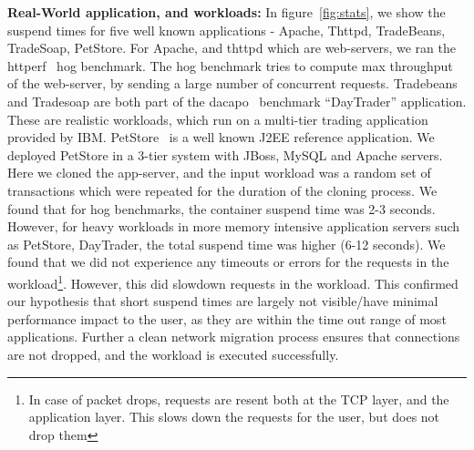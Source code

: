 \noindent
\textbf{Real-World application, and workloads:}
In figure~\ref{fig:stats}, we show the suspend times for five well known applications - Apache, Thttpd, TradeBeans, TradeSoap, PetStore. 
For Apache, and thttpd which are web-servers, we ran the httperf~\cite{httperf} hog benchmark. 
The hog benchmark tries to compute max throughput of the web-server, by sending a large number of concurrent requests.
Tradebeans and Tradesoap are both part of the dacapo~\cite{dacapo} benchmark ``DayTrader'' application.
These are realistic workloads, which run on a multi-tier trading application provided by IBM. 
PetStore~\cite{petstore} is a well known J2EE reference application. 
We deployed PetStore in a 3-tier system with JBoss, MySQL and Apache servers.
Here we cloned the app-server, and the input workload was a random set of transactions which were repeated for the duration of the cloning process.
We found that for hog benchmarks, the container suspend time was 2-3 seconds.
However, for heavy workloads in more memory intensive application servers such as PetStore, DayTrader, the total suspend time was higher (6-12 seconds).
We found that we did not experience any timeouts or errors for the requests in the workload\footnote{In case of packet drops, requests are resent both at the TCP layer, and the application layer. This slows down the requests for the user, but does not drop them}.
However, this did slowdown requests in the workload. 
This confirmed our hypothesis that short suspend times are largely not visible/have minimal performance impact to the user, as they are within the time out range of most applications.
Further a clean network migration process ensures that connections are not dropped, and the workload is executed successfully.
